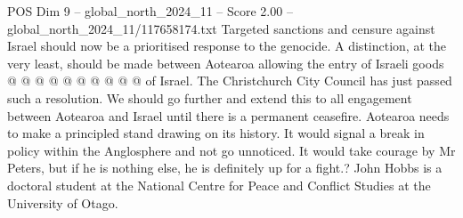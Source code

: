 \begin{textsample}{POS Dim 9 – global\_north\_2024\_11 – Score 2.00 – global\_north\_2024\_11/117658174.txt}
Targeted sanctions and censure against Israel should now be a prioritised response to the genocide.
A distinction, at the very least, should be made between Aotearoa allowing the entry of Israeli goods @ @ @ @ @ @ @ @ @ @ of Israel.
The Christchurch City Council has just passed such a resolution.
We should go further and extend this to all engagement between Aotearoa and Israel until there is a permanent ceasefire.
Aotearoa needs to make a principled stand drawing on its history.
It would signal a break in policy within the Anglosphere and not go unnoticed.
It would take courage by Mr Peters, but if he is nothing else, he is definitely up for a fight.?
John Hobbs is a doctoral student at the National Centre for Peace and Conflict Studies at the University of Otago.

\end{textsample}
